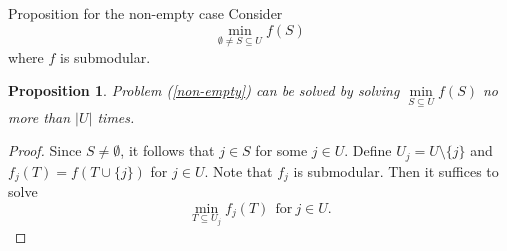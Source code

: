 \documentclass[usenames,dvipsnames]{beamer}
\newcommand{\R}{\mathbb{R}}
\newtheorem{prop}{Proposition}
\begin{document}

\begin{frame}{Proposition for the non-empty case}
  Consider \begin{equation}\min\limits_{\emptyset \neq S \subseteq U}
    f(S)\label{non-empty}\end{equation} where $f$ is submodular.
  \begin{prop}
    Problem (\ref{non-empty}) can be solved by solving $\min\limits_{S
      \subseteq U} f(S)$ no more than $|U|$ times.
  \end{prop}
  \begin{proof}
    Since $S \neq \emptyset$, it follows that $j \in S$ for some $j
    \in U$. Define $U_j = U \setminus \{j\}$ and $f_j(T) = f(T \cup
    \{j\})$ for $j \in U$. Note that $f_j$ is submodular. Then it
    suffices to solve \[\min\limits_{T \subseteq U_j}
    f_j(T)~~\text{for}~j \in U.\]
  \end{proof}
\end{frame}
\end{document}
